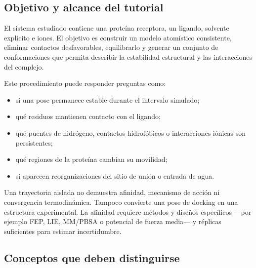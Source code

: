 \documentclass[
  spanish,
  11pt,
  a4paper]{article}
\providecommand{\tightlist}{%
  \setlength{\itemsep}{0pt}\setlength{\parskip}{0pt}}
\begin{document}
\subsection{Objetivo y alcance del
tutorial}\label{objetivo-y-alcance-del-tutorial}

El sistema estudiado contiene una proteína receptora, un ligando,
solvente explícito e iones. El objetivo es construir un modelo
atomístico consistente, eliminar contactos desfavorables, equilibrarlo y
generar un conjunto de conformaciones que permita describir la
estabilidad estructural y las interacciones del complejo.

Este procedimiento puede responder preguntas como:

\begin{itemize}
\tightlist
\item
  si una pose permanece estable durante el intervalo simulado;
\item
  qué residuos mantienen contacto con el ligando;
\item
  qué puentes de hidrógeno, contactos hidrofóbicos o interacciones
  iónicas son persistentes;
\item
  qué regiones de la proteína cambian su movilidad;
\item
  si aparecen reorganizaciones del sitio de unión o entrada de agua.
\end{itemize}

Una trayectoria aislada no demuestra afinidad, mecanismo de acción ni
convergencia termodinámica. Tampoco convierte una pose de docking en una
estructura experimental. La afinidad requiere métodos y diseños
específicos ---por ejemplo FEP, LIE, MM/PBSA o potencial de fuerza
media--- y réplicas suficientes para estimar incertidumbre.

\subsection{Conceptos que deben
distinguirse}\label{conceptos-que-deben-distinguirse}
\end{document}
